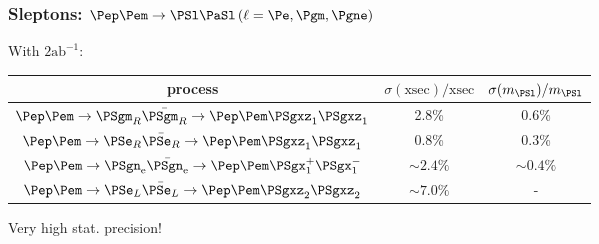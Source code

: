 \documentclass{beamer}
\begin{document}
\begin{frame}
\frametitle{Sleptons: $\Pep\Pem \to \PSl \PaSl \,(\ell = \Pe,\Pgm,\Pgne)$}
With $2\textrm{ab}^{-1}$:
\begin{center}
\begin{tabular}{ccc}
process & $\sigma(\textrm{xsec})/\textrm{xsec}$ & $\sigma(m_{\PSl})/m_{\PSl}$\\
\midrule
$\Pep\Pem \to \PSgm_R\bar{\PSgm_R} \to \Pep\Pem\PSgxz_1\PSgxz_1$ & 2.8\% &0.6\%\\ 
$\Pep\Pem \to \PSe_R\bar{\PSe_R} \to \Pep\Pem\PSgxz_1\PSgxz_1$ & 0.8\% & 0.3\%\\
$\Pep\Pem \to \PSgn_{\textrm{e}}\bar{\PSgn_{\textrm{e}}} \to
\Pep\Pem\PSgx^+_1\PSgx^-_1$ & $\sim2.4\%$ & $\sim0.4\%$ \\ $\Pep\Pem \to \PSe_L\bar{\PSe_L} \to \Pep\Pem\PSgxz_2\PSgxz_2$ & $\sim7.0\%$ &
-\\
\bottomrule
\end{tabular}
\end{center}
\alert{Very high stat. precision!}
\end{frame}
\end{document}
